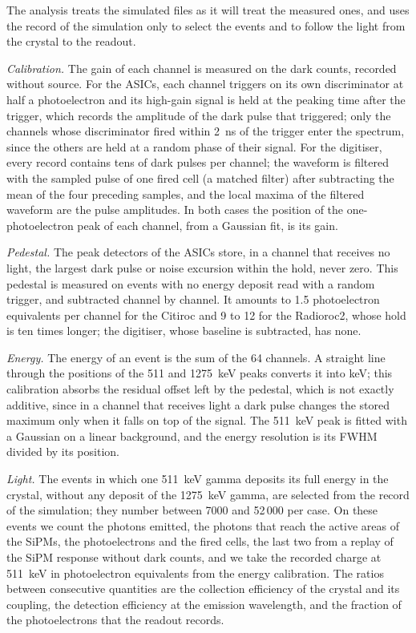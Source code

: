 \documentclass[11pt]{article}
\begin{document}
The analysis treats the simulated files as it will treat the measured ones,
and uses the record of the simulation only to select the events and to
follow the light from the crystal to the readout.

\emph{Calibration.} The gain of each channel is measured on the dark
counts, recorded without source. For the ASICs, each channel triggers on
its own discriminator at half a photoelectron and its high-gain signal is
held at the peaking time after the trigger, which records the amplitude of
the dark pulse that triggered; only the channels whose discriminator fired
within 2~ns of the trigger enter the spectrum, since the others are held
at a random phase of their signal. For the digitiser, every record
contains tens of dark pulses per channel; the waveform is filtered with
the sampled pulse of one fired cell (a matched filter) after subtracting
the mean of the four preceding samples, and the local maxima of the
filtered waveform are the pulse amplitudes. In both cases the position of
the one-photoelectron peak of each channel, from a Gaussian fit, is its
gain.

\emph{Pedestal.} The peak detectors of the ASICs store, in a channel that
receives no light, the largest dark pulse or noise excursion within the
hold, never zero. This pedestal is measured on events with no energy
deposit read with a random trigger, and subtracted channel by channel. It
amounts to 1.5 photoelectron equivalents per channel for the Citiroc and
9 to 12 for the Radioroc2, whose hold is ten times longer; the
digitiser, whose baseline is subtracted, has none.

\emph{Energy.} The energy of an event is the sum of the 64 channels. A
straight line through the positions of the 511 and 1275~keV peaks
converts it into keV; this calibration absorbs the residual offset left
by the pedestal, which is not exactly additive, since in a channel that
receives light a dark pulse changes the stored maximum only when it falls
on top of the signal. The 511~keV peak is fitted with a Gaussian on a
linear background, and the energy resolution is its FWHM divided by its
position.

\emph{Light.} The events in which one 511~keV gamma deposits its full
energy in the crystal, without any deposit of the 1275~keV gamma, are
selected from the record of the simulation; they number between 7000 and
52\,000 per case. On these events we count the photons emitted, the
photons that reach the active areas of the SiPMs, the photoelectrons and
the fired cells, the last two from a replay of the SiPM response without
dark counts, and we take the recorded charge at 511~keV in photoelectron
equivalents from the energy calibration. The ratios between consecutive
quantities are the collection efficiency of the crystal and its coupling,
the detection efficiency at the emission wavelength, and the
fraction of the photoelectrons that the readout records.
\end{document}
